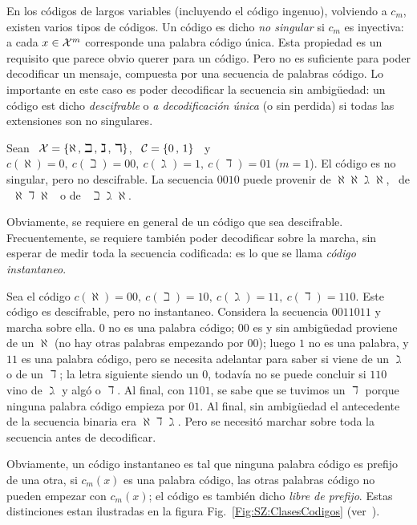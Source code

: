 En los c\'odigos de largos variables (incluyendo el c\'odigo ingenuo), volviendo
a  $c_m$, existen  varios tipos  de  c\'odigos.  Un  c\'odigo es  dicho {\it  no
  singular} si $c_m$  es inyectiva: a cada $x \in  \mathcal{X}^m$ corresponde una palabra
c\'odigo \'unica. Esta propiedad es un requisito que parece obvio querer para un
c\'odigo.  Pero  no es suficiente  para poder decodificar un  mensaje, compuesta
por una  secuencia de palabras  c\'odigo.  Lo importante  en este caso  es poder
decodificar  la   secuencia  sin  ambig\"uedad:  un  c\'odigo   est  dicho  {\it
  descifrable} o {\it  a decodificaci\'on \'unica} (o sin  perdida) si todas las
extensiones son no singulares.
%
\begin{ejemplo}
\label{Ej:SZ:CodigoNoSingularDecifrable}
%
Sean \ $\mathcal{X} = \{ \aleph \, , \, \beth \, , \, \gimel \, , \, \daleth \}$, \ $\mathcal{C} =
\{0 \, , \, 1  \}$ \ y \ $c(\aleph) = 0, \: c(\beth) =  00, \: c(\gimel) = 1, \:
c(\daleth) =  01$ ($m = 1$).  El  c\'odigo es no singular,  pero no descifrable.
La  secuencia  $0010$  puede  provenir  de $\aleph\aleph\gimel\aleph$,  \  de  \
$\aleph\daleth\aleph$ \ o de \ $\beth\gimel\aleph$.
\end{ejemplo}
%
Obviamente,  se  requiere  en  general  de  un  c\'odigo  que  sea  descifrable.
Frecuentemente,  se requiere tambi\'en  poder decodificar  sobre la  marcha, sin
esperar de medir toda la secuencia  codificada: es lo que se llama {\it c\'odigo
  instantaneo}.
%
\begin{ejemplo}
\label{Ej:SZ:CodigoDcifrableNoInstantaneo}
%
  Sea el  c\'odigo $c(\aleph)  = 00,  \: c(\beth) =  10, \:  c(\gimel) =  11, \:
  c(\daleth)  =  110$.  Este  c\'odigo  es  descifrable,  pero  no  instantaneo.
  Considera la secuencia  $0011011$ y marcha sobre ella.  $0$  no es una palabra
  c\'odigo; $00$  es y sin  ambig\"uedad proviene de  un $\aleph$ (no  hay otras
  palabras  empezando por $00$);  luego $1$  no es  una palabra,  y $11$  es una
  palabra  c\'odigo,  pero se  necesita  adelantar para  saber  si  viene de  un
  $\gimel$ o de un $\daleth$; la  letra siguiente siendo un $0$, todav\'ia no se
  puede concluir si $110$ vino de  $\gimel$ y alg\'o o $\daleth$.  Al final, con
  $1101$, se  sabe que se tuvimos  un $\daleth$ porque  ninguna palabra c\'odigo
  empieza por $01$.   Al final, sin ambig\"uedad el  antecedente de la secuencia
  binaria era  $\aleph\daleth\gimel$.  Pero se necesit\'o marchar  sobre toda la
  secuencia antes de decodificar.
\end{ejemplo}
%
Obviamente,  un c\'odigo  instantaneo es  tal  que ninguna  palabra c\'odigo  es
prefijo de una otra, \ie si $c_m(x)$ es una palabra c\'odigo, las otras palabras
c\'odigo no  pueden empezar  con $c_m(x)$; el  c\'odigo es tambi\'en  dicho {\it
  libre  de  prefijo}.   Estas   distinciones  estan  ilustradas  en  la  figura
Fig.~\ref{Fig:SZ:ClasesCodigos} (ver~\cite[cap.~5]{CovTho06}).

